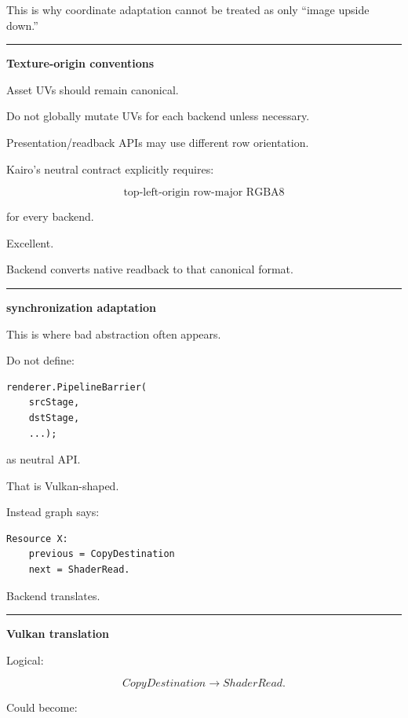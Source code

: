 This is why coordinate adaptation cannot be treated as only ``image upside down.''

\begin{center}\rule{0.5\linewidth}{0.5pt}\end{center}

\textbf{Texture-origin conventions}

Asset UVs should remain canonical.

Do not globally mutate UVs for each backend unless necessary.

Presentation/readback APIs may use different row orientation.

Kairo's neutral  contract explicitly requires:

\[
\boxed{
\text{top-left-origin row-major RGBA8}
}
\]

for every backend.

Excellent.

Backend converts native readback to that canonical format.

\begin{center}\rule{0.5\linewidth}{0.5pt}\end{center}

\textbf{synchronization adaptation}

This is where bad abstraction often appears.

Do not define:

\begin{verbatim}
renderer.PipelineBarrier(
    srcStage,
    dstStage,
    ...);
\end{verbatim}

as neutral API.

That is Vulkan-shaped.

Instead graph says:

\begin{verbatim}
Resource X:
    previous = CopyDestination
    next = ShaderRead.
\end{verbatim}

Backend translates.

\begin{center}\rule{0.5\linewidth}{0.5pt}\end{center}

\textbf{Vulkan translation}

Logical:

\[
CopyDestination
\rightarrow
ShaderRead.
\]

Could become:

